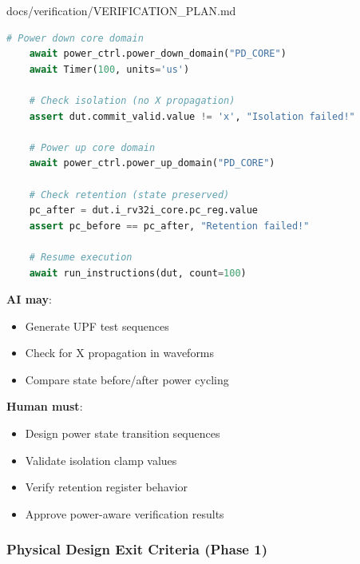 \begin{relocated}{docs/verification/VERIFICATION_PLAN.md}
\begin{lstlisting}[language=Python]
    # Power down core domain
    await power_ctrl.power_down_domain("PD_CORE")
    await Timer(100, units='us')

    # Check isolation (no X propagation)
    assert dut.commit_valid.value != 'x', "Isolation failed!"

    # Power up core domain
    await power_ctrl.power_up_domain("PD_CORE")

    # Check retention (state preserved)
    pc_after = dut.i_rv32i_core.pc_reg.value
    assert pc_before == pc_after, "Retention failed!"

    # Resume execution
    await run_instructions(dut, count=100)
\end{lstlisting}

\textbf{AI may}:

\begin{itemize}
\tightlist
\item
  Generate UPF test sequences
\item
  Check for X propagation in waveforms
\item
  Compare state before/\allowbreak{}after power cycling
\end{itemize}

\textbf{Human must}:

\begin{itemize}
\tightlist
\item
  Design power state transition sequences
\item
  Validate isolation clamp values
\item
  Verify retention register behavior
\item
  Approve power-aware verification results
\end{itemize}

\subsubsection{Physical Design Exit Criteria (Phase 1)}\label{ds:ch:verification-plan:physical-design-exit-criteria-phase-1}


\end{relocated}
